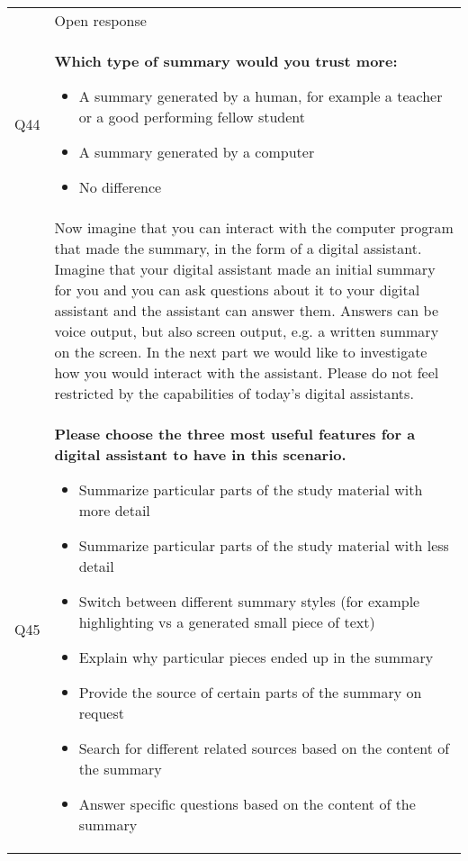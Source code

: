 \begin{xtabular}{@{\,}l <{\hskip 2pt} >{\raggedright\arraybackslash}p{0.82\textwidth}}
        & Open response

        \\

        Q44 & \textbf{Which type of summary would you trust more:}
        \begin{itemize}[label=$\square$, leftmargin=*, nosep]
          \item A summary generated by a human, for example a teacher or a good performing fellow student
          \item A summary generated by a computer
          \item No difference
        \end{itemize}

        \\

        & Now imagine that you can interact with the computer program that made the summary, in the form of a digital assistant. Imagine that your digital assistant made an initial summary for you and you can ask questions about it to your digital assistant and the assistant can answer them. Answers can be voice output, but also screen output, e.g. a written summary on the screen. In the next part we would like to investigate how you would interact with the assistant. Please do not feel restricted by the capabilities of today's digital assistants. \\

        Q45 & \textbf{Please choose the three most useful features for a digital assistant to have in this scenario.}
        \begin{itemize}[label=$\square$, leftmargin=*, nosep]
          \item Summarize particular parts of the study material with more detail
          \item Summarize particular parts of the study material with less detail
          \item Switch between different summary styles (for example highlighting vs a generated small piece of text)
          \item Explain why particular pieces ended up in the summary
          \item Provide the source of certain parts of the summary on request
          \item Search for different related sources based on the content of the summary
          \item Answer specific questions based on the content of the summary
        \end{itemize}


\end{xtabular}
